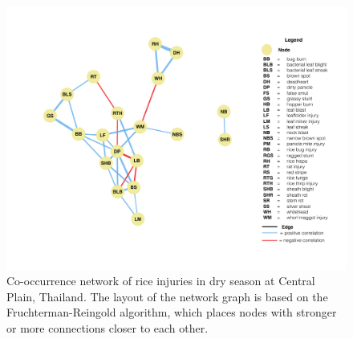 \begin{figure}
    \centering
        \includegraphics[width = 1\textwidth]{figures/fullnetwork_RRds.pdf}
        \caption{Co-occurrence network of rice injuries in dry season at Central Plain, Thailand. The layout of the network graph is based on the Fruchterman-Reingold algorithm, which places nodes with stronger or more connections closer to each other.}
        \label{fig:fullnetwork_RRds}
    \end{figure}

